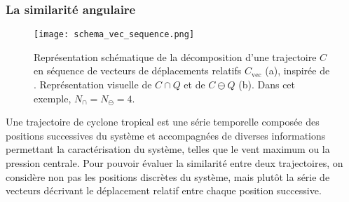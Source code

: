 \documentclass[../main.tex]{subfiles}
\begin{document}
\subsubsection*{La similarité angulaire}

\begin{figure}[htbp]
    \centering
    \texttt{[image: schema\_vec\_sequence.png]}
    \caption{Représentation schématique de la décomposition d'une trajectoire $C$ en séquence de vecteurs de déplacements relatifs $C_{\text{vec}}$ (a),
    inspirée de \cite{nakamura_shapebased_2013}. Représentation visuelle de $C \cap Q$ et de $C \ominus Q$ (b). Dans cet exemple, $N_\cap = N_\ominus = 4$.}
    \label{fig:schema_trajectoires}
\end{figure}

Une trajectoire de cyclone tropical est une série temporelle composée des positions successives du système et accompagnées de diverses informations permettant
la caractérisation du système, telles que le vent maximum ou la pression centrale. Pour pouvoir évaluer la similarité entre deux trajectoires, on considère non
pas les positions discrètes du système, mais plutôt la série de vecteurs décrivant le déplacement relatif entre chaque position successive.
\end{document}
